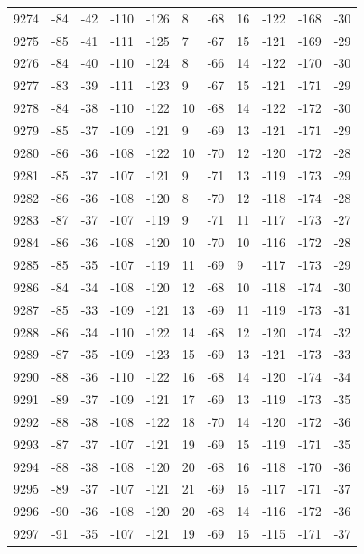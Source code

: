 \begin{table}[H]
\begin{tabular}{lllllllllll}
9274 & -84 & -42 & -110 & -126 & 8 & -68 & 16 & -122 & -168 & -30 \\
9275 & -85 & -41 & -111 & -125 & 7 & -67 & 15 & -121 & -169 & -29 \\
9276 & -84 & -40 & -110 & -124 & 8 & -66 & 14 & -122 & -170 & -30 \\
9277 & -83 & -39 & -111 & -123 & 9 & -67 & 15 & -121 & -171 & -29 \\
9278 & -84 & -38 & -110 & -122 & 10 & -68 & 14 & -122 & -172 & -30 \\
9279 & -85 & -37 & -109 & -121 & 9 & -69 & 13 & -121 & -171 & -29 \\
9280 & -86 & -36 & -108 & -122 & 10 & -70 & 12 & -120 & -172 & -28 \\
9281 & -85 & -37 & -107 & -121 & 9 & -71 & 13 & -119 & -173 & -29 \\
9282 & -86 & -36 & -108 & -120 & 8 & -70 & 12 & -118 & -174 & -28 \\
9283 & -87 & -37 & -107 & -119 & 9 & -71 & 11 & -117 & -173 & -27 \\
9284 & -86 & -36 & -108 & -120 & 10 & -70 & 10 & -116 & -172 & -28 \\
9285 & -85 & -35 & -107 & -119 & 11 & -69 & 9 & -117 & -173 & -29 \\
9286 & -84 & -34 & -108 & -120 & 12 & -68 & 10 & -118 & -174 & -30 \\
9287 & -85 & -33 & -109 & -121 & 13 & -69 & 11 & -119 & -173 & -31 \\
9288 & -86 & -34 & -110 & -122 & 14 & -68 & 12 & -120 & -174 & -32 \\
9289 & -87 & -35 & -109 & -123 & 15 & -69 & 13 & -121 & -173 & -33 \\
9290 & -88 & -36 & -110 & -122 & 16 & -68 & 14 & -120 & -174 & -34 \\
9291 & -89 & -37 & -109 & -121 & 17 & -69 & 13 & -119 & -173 & -35 \\
9292 & -88 & -38 & -108 & -122 & 18 & -70 & 14 & -120 & -172 & -36 \\
9293 & -87 & -37 & -107 & -121 & 19 & -69 & 15 & -119 & -171 & -35 \\
9294 & -88 & -38 & -108 & -120 & 20 & -68 & 16 & -118 & -170 & -36 \\
9295 & -89 & -37 & -107 & -121 & 21 & -69 & 15 & -117 & -171 & -37 \\
9296 & -90 & -36 & -108 & -120 & 20 & -68 & 14 & -116 & -172 & -36 \\
9297 & -91 & -35 & -107 & -121 & 19 & -69 & 15 & -115 & -171 & -37 \\

\end{tabular}
\end{table}
